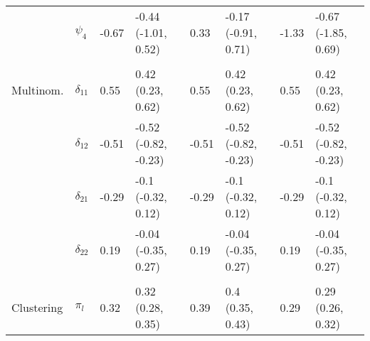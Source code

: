 \documentclass[]{article}
\begin{document}
\begin{table}[t]
\begin{tabular}{llllllll}
\hspace{1em} & $\psi_{4}$ & -0.67 & -0.44 (-1.01, 0.52) & 0.33 & -0.17 (-0.91, 0.71) & -1.33 & -0.67 (-1.85, 0.69)\\
\addlinespace[0.3em]
\multicolumn{8}{l}{\textbf{ }}\\
\hspace{1em}Multinom. & $\delta_{11}$ & 0.55 & 0.42 (0.23, 0.62) & 0.55 & 0.42 (0.23, 0.62) & 0.55 & 0.42 (0.23, 0.62)\\
\hspace{1em} & $\delta_{12}$ & -0.51 & -0.52 (-0.82, -0.23) & -0.51 & -0.52 (-0.82, -0.23) & -0.51 & -0.52 (-0.82, -0.23)\\
\hspace{1em} & $\delta_{21}$ & -0.29 & -0.1 (-0.32, 0.12) & -0.29 & -0.1 (-0.32, 0.12) & -0.29 & -0.1 (-0.32, 0.12)\\
\hspace{1em} & $\delta_{22}$ & 0.19 & -0.04 (-0.35, 0.27) & 0.19 & -0.04 (-0.35, 0.27) & 0.19 & -0.04 (-0.35, 0.27)\\
\addlinespace[0.3em]
\multicolumn{8}{l}{\textbf{ }}\\
\hspace{1em}Clustering & $\pi_l$ & 0.32 & 0.32 (0.28, 0.35) & 0.39 & 0.4 (0.35, 0.43) & 0.29 & 0.29 (0.26, 0.32)\\
\bottomrule
\end{tabular}
\end{table}
\end{document}
